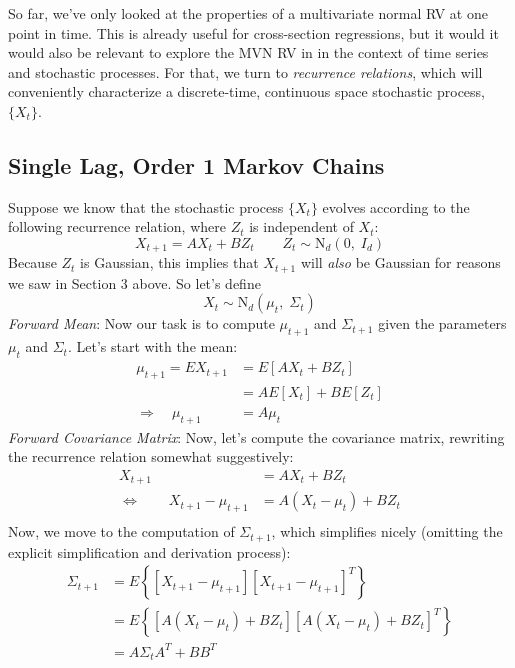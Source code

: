 \documentclass[12pt]{article}
\theoremstyle{plain}
\theoremstyle{definition}
\theoremstyle{remark}
\begin{document}
So far, we've only looked at the properties of a multivariate
normal RV at one point in time. This is already useful for
cross-section regressions, but it would
it would also be relevant to explore
the MVN RV in in the context of time series and stochastic
processes. For that, we turn
to \emph{recurrence relations}, which will conveniently characterize
a discrete-time, continuous space stochastic process,
$\{{X}_t\}$.

\subsection{Single Lag, Order 1 Markov Chains}

Suppose we know that the stochastic process $\{{X}_t\}$
evolves according to the following recurrence relation,
where ${Z}_t$ is independent of ${X}_t$:
\begin{equation}
    {X}_{t+1} = A {X}_t + B {Z}_t
    \qquad {Z}_t \sim \text{N}_d(0, \; I_d)
\end{equation}
Because ${Z}_t$ is Gaussian, this implies that
${X}_{t+1}$ will \emph{also} be Gaussian for reasons we saw
in Section 3 above. So let's define
\begin{equation}
    {X}_t \sim \text{N}_d(\mu_t, \; \Sigma_t)
\end{equation}
{\sl Forward Mean}:
Now our task is to compute $\mu_{t+1}$ and $\Sigma_{t+1}$
given the parameters $\mu_t$ and $\Sigma_t$.  Let's start with the
mean:
\begin{align*}
    \mu_{t+1} = E{X}_{t+1} &= E\left[A{X}_t +
	B {Z}_t\right] \\
    &= AE[{X}_t] + BE[{Z}_t] \\
    \Rightarrow \quad \mu_{t+1} &= A\mu_t
\end{align*}
{\sl Forward Covariance Matrix}:
Now, let's compute the covariance matrix, rewriting the recurrence
relation somewhat suggestively:
\begin{align*}
    {X}_{t+1} &= A {X}_t + B {Z}_t \\
    \Leftrightarrow \qquad
	{X}_{t+1} - \mu_{t+1} &=
	A ({X}_t - \mu_t) + B {Z}_t \\
\end{align*}
Now, we move to the computation of $\Sigma_{t+1}$, which simplifies
nicely (omitting the explicit simplification and derivation process):
\begin{align*}
    \Sigma_{t+1} &= E\left\{ \left[{X}_{t+1} - \mu_{t+1} \right]
    \left[{X}_{t+1} - \mu_{t+1} \right]^T \right\} \\
    &= E\left\{ \left[A ({X}_t - \mu_t) + B {Z}_t\right]
	\left[A ({X}_t - \mu_t) + B {Z}_t\right]^T
	\right\} \\
    &= A\Sigma_t A^T + BB^T
\end{align*}
\end{document}

